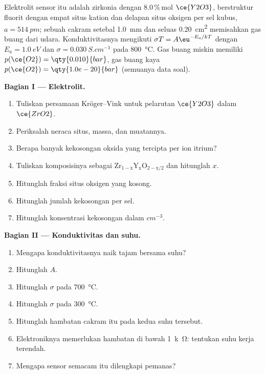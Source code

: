 \begin{problem}
\label{pb:b3:solid-state:1}
Elektrolit sensor itu adalah zirkonia dengan 8.0\,\%\,mol $\ce{Y2O3}$, berstruktur fluorit
dengan empat situs kation dan delapan situs oksigen per sel kubus, $a = \qty{514}{pm}$; sebuah cakram
setebal \qty{1.0}{mm} dan seluas \qty{0.20}{cm^2} memisahkan gas buang dari udara.
Konduktivitasnya mengikuti $\sigma T = A\eu^{-E_a/kT}$ dengan $E_a = \qty{1.0}{eV}$ dan $\sigma = \qty{0.030}{S.cm^{-1}}$ pada \qty{800}{\celsius}. Gas buang
miskin memiliki $p(\ce{O2}) = \qty{0.010}{bar}$, gas buang kaya $p(\ce{O2}) = \qty{1.0e-20}{bar}$ (semuanya data soal).

\medskip\noindent\textbf{Bagian I --- Elektrolit.}
\begin{enumerate}[beginpenalty=10000]
  \item Tuliskan persamaan Kröger--Vink untuk pelarutan $\ce{Y2O3}$ dalam $\ce{ZrO2}$.
  \item Periksalah neraca situs, massa, dan muatannya.
  \item Berapa banyak kekosongan oksida yang tercipta per ion itrium?
  \item Tuliskan komposisinya sebagai $\mathrm{Zr_{1-x}Y_xO_{2-x/2}}$ dan hitunglah $x$.
  \item Hitunglah fraksi situs oksigen yang kosong.
  \item Hitunglah jumlah kekosongan per sel.
  \item Hitunglah konsentrasi kekosongan dalam $\unit{cm^{-3}}$.
\end{enumerate}

\medskip\noindent\textbf{Bagian II --- Konduktivitas dan suhu.}
\begin{enumerate}[resume, beginpenalty=10000]
  \item Mengapa konduktivitasnya naik tajam bersama suhu?
  \item Hitunglah $A$.
  \item Hitunglah $\sigma$ pada \qty{700}{\celsius}.
  \item Hitunglah $\sigma$ pada \qty{300}{\celsius}.
  \item Hitunglah hambatan cakram itu pada kedua suhu tersebut.
  \item Elektroniknya memerlukan hambatan di bawah \qty{1}{k\ohm}: tentukan suhu kerja
        terendah.
  \item Mengapa sensor semacam itu dilengkapi pemanas?
\end{enumerate}


\end{problem}

